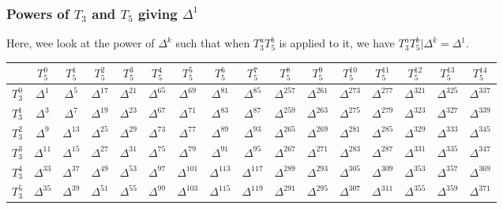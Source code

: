\subsubsection{Powers of $T_3$ and $T_5$ giving $\Delta^1$}
Here, wee look at the power of $\Delta^k$ such that when $T_3^aT_5^b$ is applied to it, we have $T_3^aT_5^b|\Delta^k = \Delta^1$.
\begin{center}
	\begin{tabular}{|c||c|c|c|c|c|c|c|c|c|c|c|c|c|c|c|}
		\hline
		\textbf{} & \textbf{$T_5^{0}$} & \textbf{$T_5^{1}$} & \textbf{$T_5^{2}$} & \textbf{$T_5^{3}$} & \textbf{$T_5^{4}$} & \textbf{$T_5^{5}$} & \textbf{$T_5^{6}$} & \textbf{$T_5^{7}$} & \textbf{$T_5^{8}$} & \textbf{$T_5^{9}$} & \textbf{$T_5^{10}$} & \textbf{$T_5^{11}$} & \textbf{$T_5^{12}$} & \textbf{$T_5^{13}$} & \textbf{$T_5^{14}$} \\
		\hline\hline
		$T_3^{0}$ & $\Delta^{1}$ & $\Delta^{5}$ & $\Delta^{17}$ & $\Delta^{21}$ & $\Delta^{65}$ & $\Delta^{69}$ & $\Delta^{81}$ & $\Delta^{85}$ & $\Delta^{257}$ & $\Delta^{261}$ & $\Delta^{273}$ & $\Delta^{277}$ & $\Delta^{321}$ & $\Delta^{325}$ & $\Delta^{337}$ \\
		$T_3^{1}$ & $\Delta^{3}$ & $\Delta^{7}$ & $\Delta^{19}$ & $\Delta^{23}$ & $\Delta^{67}$ & $\Delta^{71}$ & $\Delta^{83}$ & $\Delta^{87}$ & $\Delta^{259}$ & $\Delta^{263}$ & $\Delta^{275}$ & $\Delta^{279}$ & $\Delta^{323}$ & $\Delta^{327}$ & $\Delta^{339}$ \\
		$T_3^{2}$ & $\Delta^{9}$ & $\Delta^{13}$ & $\Delta^{25}$ & $\Delta^{29}$ & $\Delta^{73}$ & $\Delta^{77}$ & $\Delta^{89}$ & $\Delta^{93}$ & $\Delta^{265}$ & $\Delta^{269}$ & $\Delta^{281}$ & $\Delta^{285}$ & $\Delta^{329}$ & $\Delta^{333}$ & $\Delta^{345}$ \\
		$T_3^{3}$ & $\Delta^{11}$ & $\Delta^{15}$ & $\Delta^{27}$ & $\Delta^{31}$ & $\Delta^{75}$ & $\Delta^{79}$ & $\Delta^{91}$ & $\Delta^{95}$ & $\Delta^{267}$ & $\Delta^{271}$ & $\Delta^{283}$ & $\Delta^{287}$ & $\Delta^{331}$ & $\Delta^{335}$ & $\Delta^{347}$ \\
		$T_3^{4}$ & $\Delta^{33}$ & $\Delta^{37}$ & $\Delta^{49}$ & $\Delta^{53}$ & $\Delta^{97}$ & $\Delta^{101}$ & $\Delta^{113}$ & $\Delta^{117}$ 
		& $\Delta^{289}$ & $\Delta^{293}$ & $\Delta^{305}$ & $\Delta^{309}$ & $\Delta^{353}$ & $\Delta^{357}$ & $\Delta^{369}$ \\
		$T_3^{5}$ & $\Delta^{35}$ & $\Delta^{39}$ & $\Delta^{51}$ & $\Delta^{55}$ & $\Delta^{99}$ & $\Delta^{103}$ & $\Delta^{115}$ & $\Delta^{119}$ 
		& $\Delta^{291}$ & $\Delta^{295}$ & $\Delta^{307}$ & $\Delta^{311}$ & $\Delta^{355}$ & $\Delta^{359}$ & $\Delta^{371}$ \\

\end{tabular}
\end{center}
